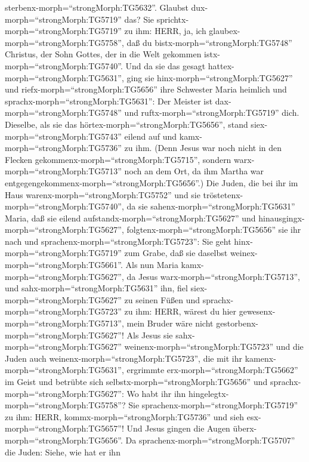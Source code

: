 sterbenx-morph=``strongMorph:TG5632''. Glaubst
dux-morph=``strongMorph:TG5719'' das?  Sie
sprichtx-morph=``strongMorph:TG5719'' zu ihm: HERR, ja, ich
glaubex-morph=``strongMorph:TG5758'', daß du
bistx-morph=``strongMorph:TG5748'' Christus, der Sohn Gottes, der in die
Welt gekommen istx-morph=``strongMorph:TG5740''.  Und da
sie das gesagt hattex-morph=``strongMorph:TG5631'', ging sie
hinx-morph=``strongMorph:TG5627'' und riefx-morph=``strongMorph:TG5656''
ihre Schwester Maria heimlich und sprachx-morph=``strongMorph:TG5631'':
Der Meister ist dax-morph=``strongMorph:TG5748'' und
ruftx-morph=``strongMorph:TG5719'' dich.  Dieselbe, als sie
das hörtex-morph=``strongMorph:TG5656'', stand
siex-morph=``strongMorph:TG5743'' eilend auf und
kamx-morph=``strongMorph:TG5736'' zu ihm.  (Denn Jesus war
noch nicht in den Flecken gekommenx-morph=``strongMorph:TG5715'',
sondern warx-morph=``strongMorph:TG5713'' noch an dem Ort, da ihm Martha
war entgegengekommenx-morph=``strongMorph:TG5656''.)  Die
Juden, die bei ihr im Haus warenx-morph=``strongMorph:TG5752'' und sie
tröstetenx-morph=``strongMorph:TG5740'', da sie
sahenx-morph=``strongMorph:TG5631'' Maria, daß sie eilend
aufstandx-morph=``strongMorph:TG5627'' und
hinausgingx-morph=``strongMorph:TG5627'',
folgtenx-morph=``strongMorph:TG5656'' sie ihr nach und
sprachenx-morph=``strongMorph:TG5723'': Sie geht
hinx-morph=``strongMorph:TG5719'' zum Grabe, daß sie daselbst
weinex-morph=``strongMorph:TG5661''.  Als nun Maria
kamx-morph=``strongMorph:TG5627'', da Jesus
warx-morph=``strongMorph:TG5713'', und sahx-morph=``strongMorph:TG5631''
ihn, fiel siex-morph=``strongMorph:TG5627'' zu seinen Füßen und
sprachx-morph=``strongMorph:TG5723'' zu ihm: HERR, wärest du hier
gewesenx-morph=``strongMorph:TG5713'', mein Bruder wäre nicht
gestorbenx-morph=``strongMorph:TG5627''!  Als Jesus sie
sahx-morph=``strongMorph:TG5627'' weinenx-morph=``strongMorph:TG5723''
und die Juden auch weinenx-morph=``strongMorph:TG5723'', die mit ihr
kamenx-morph=``strongMorph:TG5631'', ergrimmte
erx-morph=``strongMorph:TG5662'' im Geist und betrübte sich
selbstx-morph=``strongMorph:TG5656''  und
sprachx-morph=``strongMorph:TG5627'': Wo habt ihr ihn
hingelegtx-morph=``strongMorph:TG5758''? Sie
sprachenx-morph=``strongMorph:TG5719'' zu ihm: HERR,
kommx-morph=``strongMorph:TG5736'' und sieh
esx-morph=``strongMorph:TG5657''!  Und Jesus gingen die
Augen überx-morph=``strongMorph:TG5656''.  Da
sprachenx-morph=``strongMorph:TG5707'' die Juden: Siehe, wie hat er ihn

